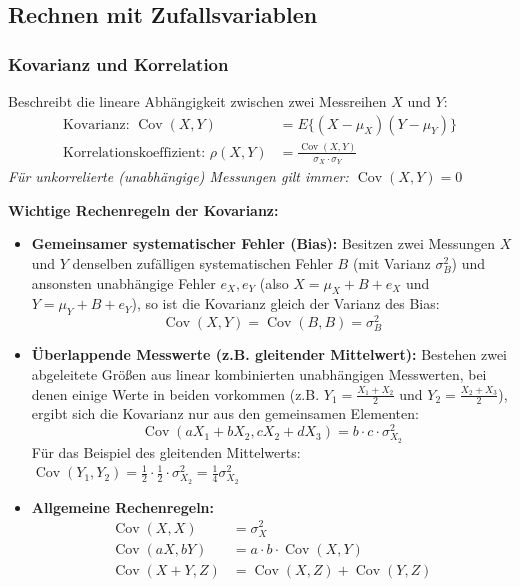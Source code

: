 \subsection{Rechnen mit Zufallsvariablen}
    \subsubsection{Kovarianz und Korrelation}
        Beschreibt die lineare Abhängigkeit zwischen zwei Messreihen $X$ und $Y$:
        \begin{align*}
            \text{Kovarianz: } \operatorname{Cov}(X,Y) &= E\{(X - \mu_X)(Y - \mu_Y)\} \\
            \text{Korrelationskoeffizient: } \rho(X,Y) &= \frac{\operatorname{Cov}(X,Y)}{\sigma_X \cdot \sigma_Y}
        \end{align*}
        \textit{Für unkorrelierte (unabhängige) Messungen gilt immer: $\operatorname{Cov}(X,Y) = 0$}

        \textbf{Wichtige Rechenregeln der Kovarianz:}
        \begin{itemize}
            \item \textbf{Gemeinsamer systematischer Fehler (Bias):} Besitzen zwei Messungen $X$ und $Y$ denselben zufälligen systematischen Fehler $B$ (mit Varianz $\sigma_B^2$) und ansonsten unabhängige Fehler $e_X, e_Y$ (also $X = \mu_X + B + e_X$ und $Y = \mu_Y + B + e_Y$), so ist die Kovarianz gleich der Varianz des Bias:
            \[ \operatorname{Cov}(X,Y) = \operatorname{Cov}(B,B) = \sigma_B^2 \]
            \item \textbf{Überlappende Messwerte (z.B. gleitender Mittelwert):} Bestehen zwei abgeleitete Größen aus linear kombinierten unabhängigen Messwerten, bei denen einige Werte in beiden vorkommen (z.B. $Y_1 = \frac{X_1 + X_2}{2}$ und $Y_2 = \frac{X_2 + X_3}{2}$), ergibt sich die Kovarianz nur aus den gemeinsamen Elementen:
            \[ \operatorname{Cov}(aX_1 + bX_2, cX_2 + dX_3) = b \cdot c \cdot \sigma_{X_2}^2 \]
            Für das Beispiel des gleitenden Mittelwerts: $\operatorname{Cov}(Y_1, Y_2) = \frac{1}{2} \cdot \frac{1}{2} \cdot \sigma_{X_2}^2 = \frac{1}{4}\sigma_{X_2}^2$
            \item \textbf{Allgemeine Rechenregeln:}
            \begin{align*}
                \operatorname{Cov}(X,X) &= \sigma_X^2\\
                \operatorname{Cov}(aX, bY) &= a \cdot b \cdot \operatorname{Cov}(X,Y) \\
                \operatorname{Cov}(X+Y, Z) &= \operatorname{Cov}(X,Z) + \operatorname{Cov}(Y,Z)
            \end{align*}
        \end{itemize}

